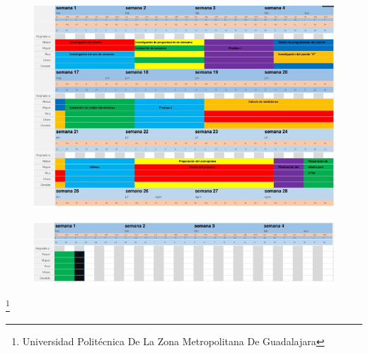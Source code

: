 \documentclass[11pt,a4paper]{article}
\begin{document}
 \begin{figure}[hbtp]
 \centering
  \includegraphics[scale=0.90]{Digrama(02).png} 
 \end{figure}
\begin{figure}[hbtp]
 \centering
  \includegraphics[scale=0.90]{Diagrama(03).png} 
 \end{figure}
 
 \footnote{Universidad Politécnica De La Zona Metropolitana De Guadalajara} 
\newpage
\end{document}
